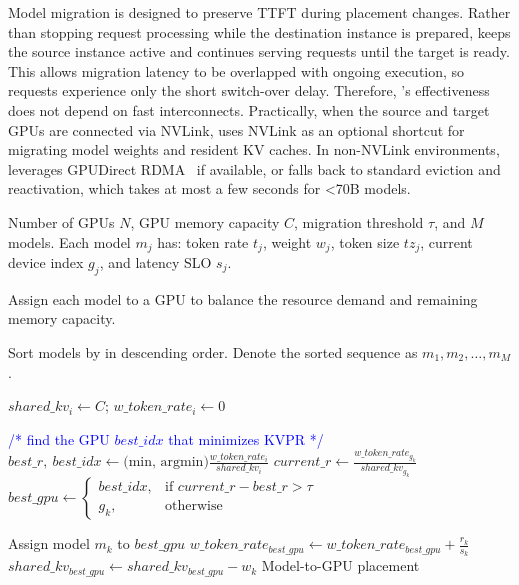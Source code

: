 Model migration is designed to preserve TTFT during placement changes. Rather than stopping request processing while the destination instance is prepared, \tool keeps the source instance active and continues serving requests until the target is ready. This allows migration latency to be overlapped with ongoing execution, so requests experience only the short switch-over delay. 
Therefore, \tool's effectiveness does not depend on fast interconnects. Practically, when the source and target GPUs are connected via NVLink, \tool uses NVLink as an optional shortcut for migrating model weights and resident KV caches. In non-NVLink environments, \tool leverages GPUDirect RDMA~\cite{gpudirect-rdma} if available, or falls back to standard eviction and reactivation, which takes at most a few seconds for <70B models.

\begin{algorithm}[t]
\small
\caption{Model Placement to Maximize Memory Headroom.}
\label{alg:global}
\begin{algorithmic}[1]
\Require 
    Number of GPUs $N$, GPU memory capacity $C$, migration threshold $\tau$, and $M$ models. Each model $m_j$ has: token rate $t_j$, weight $w_j$, token size $tz_j$, current device index $g_j$, and latency SLO $s_j$.

\Ensure Assign each model to a GPU to balance the resource demand and remaining memory capacity.

\State Sort models by  in descending order. Denote the sorted sequence as $m_1, m_2, \dots, m_M$. 

  \State $shared\_kv_i \leftarrow C$; $w\_token\_rate_i \leftarrow 0$
\EndFor

  \State \textcolor{blue}{/* find the GPU $best\_idx$ that minimizes KVPR */}
  \State   $best\_r,\ best\_idx \leftarrow \text{(min, argmin)}\frac{w\_token\_rate_i}{shared\_kv_i}$
  \State   $current\_r \leftarrow \frac{w\_token\_rate_{g_k}}{shared\_kv_{g_k}}$
  \State   $best\_gpu \gets 
  \begin{cases}
    best\_idx, & \text{if } current\_r - best\_r > \tau \\
    g_k,       & \text{otherwise}
  \end{cases}$

  \State Assign model $m_k$ to $best\_gpu$
  \State $w\_token\_rate_{best\_gpu} \gets w\_token\_rate_{best\_gpu} + \frac{r_k}{s_k}$
  \State $shared\_kv_{best\_gpu} \gets shared\_kv_{best\_gpu} - w_k$
\EndFor
\State \Return Model-to-GPU placement
\end{algorithmic}
\end{algorithm}

